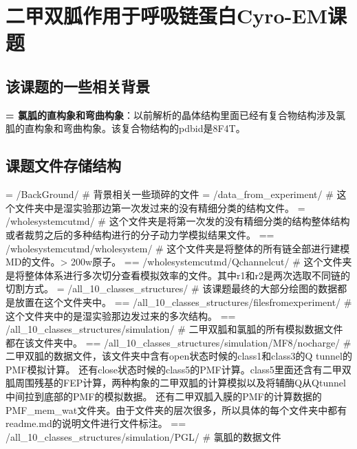 \section{二甲双胍作用于呼吸链蛋白Cyro-EM课题}
\subsection{该课题的一些相关背景}
\noindent \textbf{= 氯胍的直构象和弯曲构象}：以前解析的晶体结构里面已经有复合物结构涉及氯胍的直构象和弯曲构象。该复合物结构的pdbid是8F4T。
\subsection{课题文件存储结构}
\noindent = /BackGround/ \# 背景相关一些琐碎的文件
\newline = /data\_from\_experiment/ \# 这个文件夹中是湿实验那边第一次发过来的没有精细分类的结构文件。
\newline = /wholesystemcutmd/ \# 这个文件夹是将第一次发的没有精细分类的结构整体结构或者裁剪之后的多种结构进行的分子动力学模拟结果文件。
\newline \indent == /wholesystemcutmd/wholesystem/ \# 这个文件夹是将整体的所有链全部进行建模MD的文件。> 200w原子。
\newline \indent == /wholesystemcutmd/Qchannelcut/ \# 这个文件夹是将整体体系进行多次切分查看模拟效率的文件。其中r1和r2是两次选取不同链的切割方式。 
\newline = /all\_10\_classes\_structures/ \# 该课题最终的大部分绘图的数据都是放置在这个文件夹中。 
\newline \indent == /all\_10\_classes\_structures/filesfromexperiment/ \# 这个文件夹中的是湿实验那边发过来的多次结构。
\newline \indent == /all\_10\_classes\_structures/simulation/ \# 二甲双胍和氯胍的所有模拟数据文件都在该文件夹中。
\newline \indent == /all\_10\_classes\_structures/simulation/MF8/nocharge/ \# 二甲双胍的数据文件，该文件夹中含有open状态时候的class1和class3的Q tunnel的PMF模拟计算。
还有close状态时候的class5的PMF计算。class5里面还含有二甲双胍周围残基的FEP计算，两种构象的二甲双胍的计算模拟以及将辅酶Q从Qtunnel中间拉到底部的PMF的模拟数据。
还有二甲双胍入膜的PMF的计算数据的PMF\_mem\_wat文件夹。由于文件夹的层次很多，所以具体的每个文件夹中都有readme.md的说明文件进行文件标注。
\newline \indent == /all\_10\_classes\_structures/simulation/PGL/ \# 氯胍的数据文件
